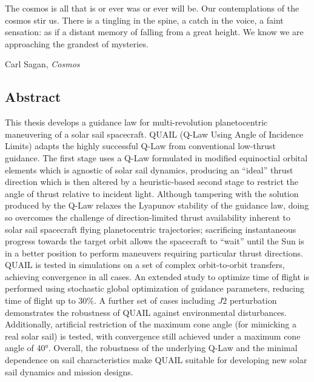 \begin{titlepage}
  
\end{titlepage}

\epigraph{
  The cosmos is all that is or ever was or ever will be. Our contemplations of the cosmos stir us. There is a tingling in the spine, a catch in the voice, a faint sensation: as if a distant memory of falling from a great height. We know we are approaching the grandest of mysteries.}{Carl Sagan, \textit{Cosmos}}

\newpage

\vspace*{\fill}
\begin{center}
  \section*{Abstract}
\end{center}
This thesis develops a guidance law for multi-revolution planetocentric maneuvering of a solar sail spacecraft. QUAIL (Q-Law Using Angle of Incidence Limits) adapts the highly successful Q-Law from conventional low-thrust guidance. The first stage uses a Q-Law formulated in modified equinoctial orbital elements which is agnostic of solar sail dynamics, producing an ``ideal'' thrust direction which is then altered by a heuristic-based second stage to restrict the angle of thrust relative to incident light. Although tampering with the solution produced by the Q-Law relaxes the Lyapunov stability of the guidance law, doing so overcomes the challenge of direction-limited thrust availability inherent to solar sail spacecraft flying planetocentric trajectories; sacrificing instantaneous progress towards the target orbit allows the spacecraft to ``wait'' until the Sun is in a better position to perform maneuvers requiring particular thrust directions. QUAIL is tested in simulations on a set of complex orbit-to-orbit transfers, achieving convergence in all cases. An extended study to optimize time of flight is performed using stochastic global optimization of guidance parameters, reducing time of flight up to 30\%. A further set of cases including \(J2\) perturbation demonstrates the robustness of QUAIL against environmental disturbances. Additionally, artificial restriction of the maximum cone angle (for mimicking a real solar sail) is tested, with convergence still achieved under a maximum cone angle of \ang{40}. Overall, the robustness of the underlying Q-Law and the minimal dependence on sail characteristics make QUAIL suitable for developing new solar sail dynamics and mission designs.

